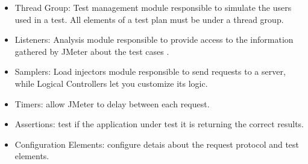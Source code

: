 \begin{itemize}
\item Thread Group: Test management module responsible to simulate the users used in a test. All elements of a test plan must be under a thread group.
\item Listeners: Analysis module responsible to provide access to the information gathered by JMeter about the test cases .
\item Samplers: Load injectors module responsible to send requests to a server, while Logical Controllers let you customize its logic.
\item Timers: allow JMeter to delay between each request.
\item Assertions: test if the application under test it is returning the correct results.
\item Configuration Elements: configure detais about the request protocol and test elements.
\end{itemize}


